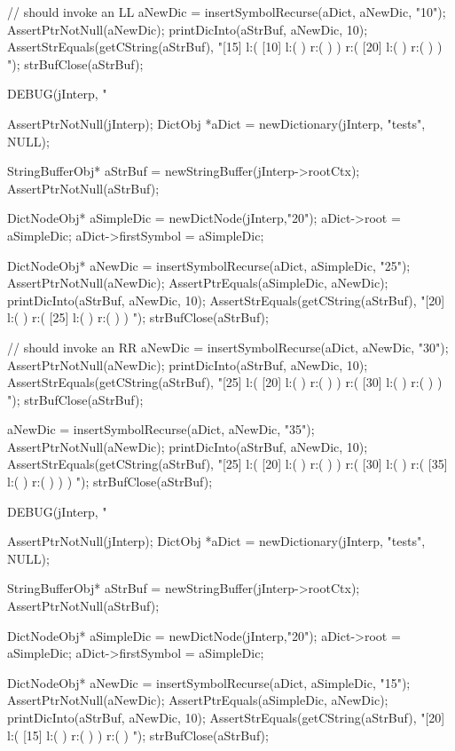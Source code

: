   // should invoke an LL
  aNewDic = insertSymbolRecurse(aDict, aNewDic, "10");
  AssertPtrNotNull(aNewDic);
  printDicInto(aStrBuf, aNewDic, 10);
  AssertStrEquals(getCString(aStrBuf),
  "[15] l:( [10] l:(  ) r:(  )  ) r:( [20] l:(  ) r:(  )  ) ");
  strBufClose(aStrBuf);
\stopCTest
\stopTestCase

\startCTest
  DEBUG(jInterp, "\n%

  AssertPtrNotNull(jInterp);
  DictObj *aDict = newDictionary(jInterp, "tests", NULL);

  StringBufferObj* aStrBuf = newStringBuffer(jInterp->rootCtx);
  AssertPtrNotNull(aStrBuf);
  
  DictNodeObj* aSimpleDic = newDictNode(jInterp,"20");
  aDict->root             = aSimpleDic;
  aDict->firstSymbol      = aSimpleDic;

  DictNodeObj* aNewDic = insertSymbolRecurse(aDict, aSimpleDic, "25");
  AssertPtrNotNull(aNewDic);
  AssertPtrEquals(aSimpleDic, aNewDic);
  printDicInto(aStrBuf, aNewDic, 10);
  AssertStrEquals(getCString(aStrBuf),
  "[20] l:(  ) r:( [25] l:(  ) r:(  )  ) ");
  strBufClose(aStrBuf);
  
  // should invoke an RR
  aNewDic = insertSymbolRecurse(aDict, aNewDic, "30");
  AssertPtrNotNull(aNewDic);
  printDicInto(aStrBuf, aNewDic, 10);
  AssertStrEquals(getCString(aStrBuf),
  "[25] l:( [20] l:(  ) r:(  )  ) r:( [30] l:(  ) r:(  )  ) ");
  strBufClose(aStrBuf);
  
  aNewDic = insertSymbolRecurse(aDict, aNewDic, "35");
  AssertPtrNotNull(aNewDic);
  printDicInto(aStrBuf, aNewDic, 10);
  AssertStrEquals(getCString(aStrBuf),
  "[25] l:( [20] l:(  ) r:(  )  ) r:( [30] l:(  ) r:( [35] l:(  ) r:(  )  )  ) ");
  strBufClose(aStrBuf);
\stopCTest
\stopTestCase

\startCTest
  DEBUG(jInterp, "\n%

  AssertPtrNotNull(jInterp);
  DictObj *aDict = newDictionary(jInterp, "tests", NULL);

  StringBufferObj* aStrBuf = newStringBuffer(jInterp->rootCtx);
  AssertPtrNotNull(aStrBuf);
  
  DictNodeObj* aSimpleDic = newDictNode(jInterp,"20");
  aDict->root             = aSimpleDic;
  aDict->firstSymbol      = aSimpleDic;

  DictNodeObj* aNewDic = insertSymbolRecurse(aDict, aSimpleDic, "15");
  AssertPtrNotNull(aNewDic);
  AssertPtrEquals(aSimpleDic, aNewDic);
  printDicInto(aStrBuf, aNewDic, 10);
  AssertStrEquals(getCString(aStrBuf),
  "[20] l:( [15] l:(  ) r:(  )  ) r:(  ) ");
  strBufClose(aStrBuf);
  
